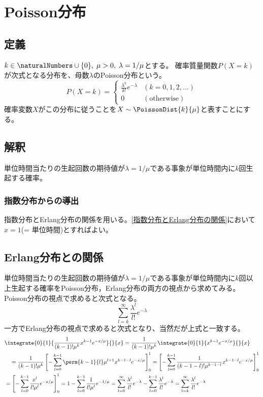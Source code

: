 \chapter{Poisson分布}
    \section{定義}
        $k\in\naturalNumbers\cup\{0\},\;\mu>0,\;\lambda=1/\mu$とする。
        確率質量関数$P(X=k)$が次式となる分布を、母数$\lambda$のPoisson分布という。
        \[
            P(X=k) =
            \begin{cases}
                \frac{\lambda^k}{k!}e^{-\lambda} & (k = 0,1,2,\dotsc) \\
                0 & (\text{otherwise})
            \end{cases}
        \]
        確率変数$X$がこの分布に従うことを$X \sim \PoissonDist{k}{\mu}$と表すことにする。
    \section{解釈}
        単位時間当たりの生起回数の期待値が$\lambda = 1/\mu$である事象が単位時間内に$k$回生起する確率。
        \subsection{指数分布からの導出}
            指数分布とErlang分布の関係を用いる。\ref{指数分布とErlang分布の関係}において$x=1$(= 単位時間)とすればよい。
    \section{Erlang分布との関係}
        単位時間当たりの生起回数の期待値が$\lambda = 1/\mu$である事象が単位時間内に$k$回以上生起する確率をPoisson分布，Erlang分布の両方の視点から求めてみる。
        Poisson分布の視点で求めると次式となる。
        \[
            \sum_{l=k}^\infty \frac{\lambda^l}{l!}e^{-\lambda}
        \]
        一方でErlang分布の視点で求めると次式となり、当然だが上式と一致する。
        \begin{align*}
            &\integrate{0}{1}{\frac{1}{(k-1)!\mu^k}x^{k-1}e^{-x/\mu}}{}{x} = \frac{1}{(k-1)!\mu^k} \integrate{0}{1}{x^{k-1}e^{-x/\mu}}{}{x} \\
            &\quad = \frac{1}{(k-1)!\mu^k}\left[ -\sum_{l=0}^{k-1}\perm{k-1}{l}\mu^{l+1}x^{k-1-l}e^{-x/\mu} \right]_0^1 = \left[ -\sum_{l=0}^{k-1} \frac{1}{(k-1-l)!\mu^{k-1-l}}x^{k-1-l}e^{-x/\mu} \right]_0^1 \\
            &= \left[ -\sum_{l=0}^{k-1} \frac{x^l}{l!\mu^l}e^{-x/\mu} \right]_0^1 = 1 - \sum_{l=0}^{k-1} \frac{1}{l!\mu^l}e^{-1/\mu} = \sum_{l=0}^\infty \frac{\lambda^l}{l!}e^{-\lambda} - \sum_{l=0}^{k-1} \frac{\lambda^l}{l!}e^{-\lambda} = \sum_{l=k}^\infty \frac{\lambda^l}{l!}e^{-\lambda}
        \end{align*}
